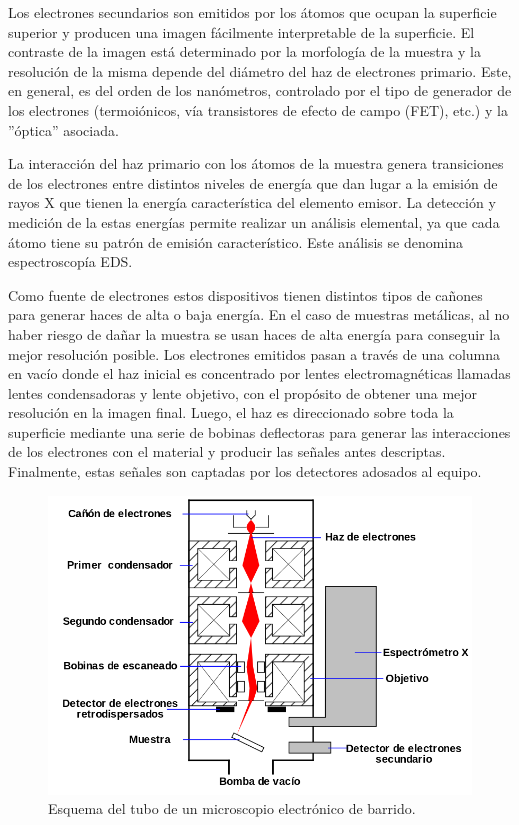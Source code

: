\documentclass[12pt]{article}
\theoremstyle{definition}
\theoremstyle{remark}
\begin{document}
Los electrones secundarios son emitidos por los átomos que ocupan la superficie superior y producen una imagen fácilmente interpretable de la superficie. El contraste de la imagen está determinado por la morfología de la muestra y la resolución de la misma depende del diámetro del haz de electrones primario. Este, en general, es del orden de los nanómetros, controlado por el tipo de generador de los electrones (termoiónicos, vía transistores de efecto de campo (FET), etc.) y la ''óptica” asociada.

La interacción del haz primario con los átomos de la muestra genera transiciones de los electrones entre distintos niveles de energía que dan lugar a la emisión de rayos X que tienen la energía característica del elemento emisor. La detección y medición de la estas energías permite realizar un análisis elemental, ya que cada átomo tiene su patrón de emisión característico. Este análisis se denomina espectroscopía EDS.

Como fuente de electrones estos dispositivos tienen distintos tipos de cañones para generar haces de alta o baja energía. En el caso de muestras metálicas, al no haber riesgo de dañar la muestra se usan haces de alta energía para conseguir la mejor resolución posible. Los electrones emitidos pasan a través de una columna en vacío donde el haz inicial es concentrado por lentes electromagnéticas llamadas lentes condensadoras y lente objetivo, con el propósito de obtener una mejor resolución en la imagen final. Luego, el haz es direccionado sobre toda la superficie mediante una serie de bobinas deflectoras para generar las interacciones de los electrones con el material y producir las señales antes descriptas. Finalmente, estas señales son captadas por los detectores adosados al equipo.

 \begin{figure}[H]
 	\centering
	\includegraphics[scale=0.5]{img/SEM.png}
 	\caption{Esquema del tubo de un microscopio electrónico de barrido.}
	\label{SEM}
\end{figure} 
\end{document}
